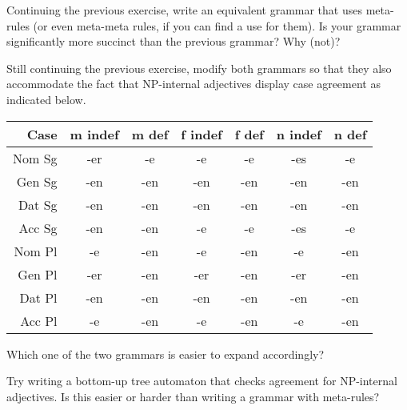 \begin{exercise}
    Continuing the previous exercise, write an equivalent grammar that uses meta-rules (or even meta-meta rules, if you can find a use for them).
    Is your grammar significantly more succinct than the previous grammar?
    Why (not)?
\end{exercise}

\begin{exercise}
    Still continuing the previous exercise, modify both grammars so that they also accommodate the fact that NP-internal adjectives display case agreement as indicated below.
    \begin{center}
        \begin{tabular}{rcccccc}
            \toprule
            \textbf{Case} & \textbf{m indef} & \textbf{m def} & \textbf{f indef} & \textbf{f def} & \textbf{n indef} & \textbf{n def}\\
            \midrule
            Nom Sg & -er & -e  & -e  & -e  & -es & -e  \\
            Gen Sg & -en & -en & -en & -en & -en & -en \\
            Dat Sg & -en & -en & -en & -en & -en & -en \\
            Acc Sg & -en & -en & -e  & -e  & -es & -e  \\
            \midrule
            Nom Pl & -e  & -en & -e  & -en & -e  & -en \\
            Gen Pl & -er & -en & -er & -en & -er & -en \\
            Dat Pl & -en & -en & -en & -en & -en & -en \\
            Acc Pl & -e  & -en & -e  & -en & -e  & -en \\
            \bottomrule
        \end{tabular}
    \end{center}
    Which one of the two grammars is easier to expand accordingly?
\end{exercise}

\begin{exercise}
    Try writing a bottom-up tree automaton that checks agreement for NP-internal adjectives.
    Is this easier or harder than writing a grammar with meta-rules?
\end{exercise}

